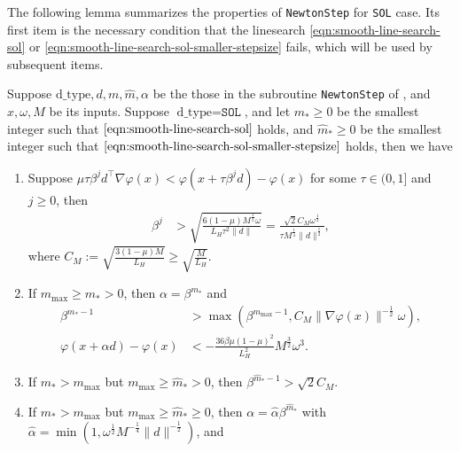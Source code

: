 The following lemma summarizes the properties of \texttt{NewtonStep} for \texttt{SOL} case. 
Its first item is the necessary condition that the linesearch \eqref{eqn:smooth-line-search-sol} or \eqref{eqn:smooth-line-search-sol-smaller-stepsize} fails,
which will be used by subsequent items.
\begin{lemma}
    \label{lem:newton-cg-sol}%
    Suppose $\text{d\_type}, d, m, \hat m, \alpha$ be the those in the subroutine \texttt{NewtonStep} of , and $x, \omega, M$ be its inputs.
    Suppose $\text{d\_type} = \texttt{SOL}$, and 
    let $m_* \geq 0$ be the smallest integer such that $\eqref{eqn:smooth-line-search-sol}$ holds, 
    and $\hat m_* \geq 0$ be the smallest integer such that $\eqref{eqn:smooth-line-search-sol-smaller-stepsize}$ holds,
    then we have
    \begin{enumerate}
        \item 
        Suppose $\mu \tau \beta^j d^\top \nabla \varphi(x) < \varphi(x + \tau \beta^j d) - \varphi(x)$ for some $\tau \in (0, 1]$ and $j \geq 0$, then 
    \begin{align}
        \label{eqn:newton-cg-sol-stepsize-when-linesearch-violated}
        \beta^{j} &
        > \sqrt{\frac{6(1 - \mu)M^{\frac{1}{2}}\omega}{L_H\tau^2\|d\|} }
        = \frac{\sqrt 2 C_M \omega^{\frac{1}{2}}}{\tau M^{\frac{1}{4}}\|d \|^{\frac{1}{2}}}
        ,
    \end{align}
        where $C_{M} := \sqrt{\frac{3(1 - \mu)M}{L_H} } \geq \sqrt{\frac{M}{L_H}}$.
        \item 
    If $m_{\mathrm{max}} \geq m_* > 0$, then $\alpha = \beta^{m_*}$ and 
    \begin{align}
        \label{eqn:newton-cg-sol-stepsize}
        \beta^{m_* - 1} &
        > \max\left ( \beta^{m_{\mathrm{max}} - 1}, C_{M} \| \nabla \varphi(x) \|^{-\frac{1}{2}}\omega \right )
        , \\
        \label{eqn:newton-cg-sol-decay}
        \varphi(x + \alpha d) - \varphi(x)
        & <
        - \frac{36\beta\mu(1 - \mu)^2}{L_H^2} M^{\frac{3}{2}} \omega^3
        .
    \end{align}
    \item If $m_* > m_{\mathrm{max}}$ but $m_{\mathrm{max}} \geq \hat m_* > 0$, then
        $\beta^{\hat m_* - 1}
        > \sqrt 2 C_{M}$.
    \item If $m_* > m_{\mathrm{max}}$ but $m_{\mathrm{max}} \geq \hat m_* \geq 0$, then $\alpha = \hat \alpha \beta^{\hat m_*}$ with $\hat \alpha = \min(1, \omega^{\frac{1}{2}}M^{-\frac{1}{4}}\|d\|^{-\frac{1}{2}})$, and 

\end{enumerate}
\end{lemma}

